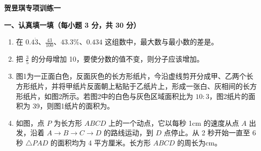 \documentclass[11pt,a4paper]{ctexart}
\begin{document}
\begin{center}
    \LARGE \textbf{贺昱琪专项训练一}
\end{center}

\vspace{0.5cm}

\noindent \textbf{一、认真填一填（每小题 3 分，共 30 分）}

\begin{enumerate}
    \item 在 $0.4\dot{3}$、$\frac{43}{100}$、$43.3\%$、$0.434$ 这组数中，最大数与最小数的差是\underline{\hspace{2cm}}。\vspace{1.2cm}
    
    \item 把 $\frac{3}{5}$ 的分母增加 10，要使分数的值不变，则分子应该增加\underline{\hspace{2cm}}。\vspace{1.2cm}
    
    \item 
    \begin{minipage}{0.65\textwidth}
        图1为一正面白色，反面灰色的长方形纸片，今沿虚线剪开分成甲、乙两个长方形纸片，并将甲纸片反面朝上粘贴于乙纸片上，形成一张白、灰相间的长方形纸片，如图2所示。若图2中的白色与灰色区域面积比为 $10 : 3$，图2纸片的面积为 39，则图1纸片的面积为\underline{\hspace{2cm}}。
    \end{minipage}
    \hfill
    \begin{minipage}{0.3\textwidth}
    \end{minipage}
    
    \item 
    \begin{minipage}{0.65\textwidth}
        如图，点 $P$ 为长方形 $ABCD$ 上的一个动点，它以每秒 1cm 的速度从点 $A$ 出发，沿着 $A \rightarrow B \rightarrow C \rightarrow D$ 的路线运动，到 $D$ 点停止。从 2 秒开始一直至 6 秒 $\triangle PAD$ 的面积均为 4 平方厘米。长方形 $ABCD$ 的周长为\underline{\hspace{2cm}}cm。
    \end{minipage}
    \hfill
    \begin{minipage}{0.3\textwidth}
    \end{minipage}
    

\end{enumerate}
\end{document}
